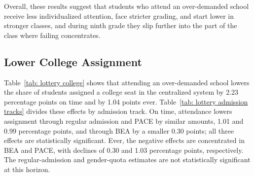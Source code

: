 Overall, these results suggest that students who attend an over-demanded school receive less individualized attention, face stricter grading, and start lower in stronger classes, and during ninth grade they slip further into the part of the class where failing concentrates.



\subsection{Lower College Assignment}

Table~\ref{tab: lottery college} shows that attending an over-demanded school lowers the share of students assigned a college seat in the centralized system by 2.23 percentage points on time and by 1.04 points ever. Table~\ref{tab: lottery admission tracks} divides these effects by admission track. On time, attendance lowers assignment through regular admission and PACE by similar amounts, 1.01 and 0.99 percentage points, and through BEA by a smaller 0.30 points; all three effects are statistically significant. Ever, the negative effects are concentrated in BEA and PACE, with declines of 0.30 and 1.03 percentage points, respectively. The regular-admission and gender-quota estimates are not statistically significant at this horizon.

